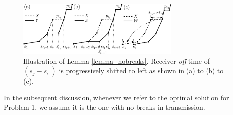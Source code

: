 \begin{figure}[htb]
  \centering
  \centerline{\includegraphics[width=8cm]{Lemma2_modified.eps}}
\caption{Illustration of Lemma \ref{lemma_nobreaks}. Receiver \textit{off} time of $(s_{j}-s_{i_1})$ is progressively shifted to left as shown in (a) to (b) to (c).}\label{fig_Lemma2}
\end{figure}
In the subsequent discussion, whenever we refer to the optimal solution for Problem 1, we assume it is the one with no breaks in transmission.
%
%
%
%
%

